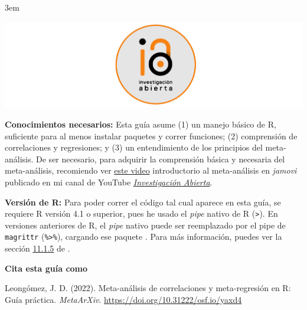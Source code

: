 \documentclass[
  bookmarksnumbered]{article}
\begin{document}
\par
\endgroup

\par
\begingroup
\leftskip3em
\rightskip\leftskip
\footnotesize

\href{https://www.youtube.com/@InvestigacionAbierta}{\includegraphics[width=6.25in,height=\textheight]{images/Logo-IA-Rectangulo.pdf}}

\textbf{Conocimientos necesarios:} Esta guía asume (1) un manejo básico de R, suficiente para al menos instalar paquetes y correr funciones; (2) comprensión de correlaciones y regresiones; y (3) un entendimiento de los principios del meta-análisis. De ser necesario, para adquirir la comprensión básica y necesaria del meta-análisis, recomiendo ver \href{https://youtu.be/ntBbkOn9D_o}{este video} introductorio al meta-análisis en \emph{jamovi} \autocite{leongomezMetaanalysis2021} publicado en mi canal de YouTube \href{https://www.youtube.com/@InvestigacionAbierta}{\emph{Investigación Abierta}}.

\textbf{Versión de R:} Para poder correr el código tal cual aparece en esta guía, se requiere R versión 4.1 o superior, pues he usado el \emph{pipe} nativo de R (\texttt{\textbar{}\textgreater{}}). En versiones anteriores de R, el \emph{pipe} nativo puede ser reemplazado por el pipe de \texttt{magrittr} (\texttt{\%\textgreater{}\%}), cargando ese paquete \autocite{magrittrcite}. Para más información, puedes ver la sección \href{https://datanalytics.com/libro_r/1100_programacion.html\#tuber\%C3\%ADas-pipes}{11.1.5} de \textcite{gil2023}.

\par
\endgroup
\vfill

\textbf{Cita esta guía como } \hrulefill 

\begin{hangparas}{.25in}{1}
Leongómez, J. D. (2022). Meta-análisis de correlaciones y meta-regresión en R: Guía práctica. \textit{MetaArXiv}. \url{https://doi.org/10.31222/osf.io/yaxd4}
\end{hangparas}
\newpage

{\hypersetup{hidelinks}
 \setcounter{tocdepth}{5}
 \tableofcontents
}
\end{document}
